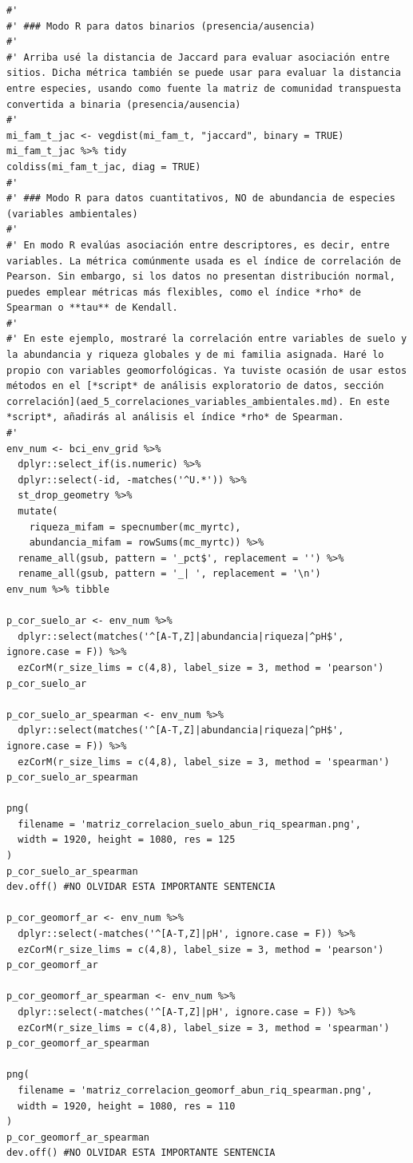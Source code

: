\documentclass[11pt,]{article}
\begin{document}
\begin{verbatim}
#' 
#' ### Modo R para datos binarios (presencia/ausencia)
#' 
#' Arriba usé la distancia de Jaccard para evaluar asociación entre sitios. Dicha métrica también se puede usar para evaluar la distancia entre especies, usando como fuente la matriz de comunidad transpuesta convertida a binaria (presencia/ausencia)
#' 
mi_fam_t_jac <- vegdist(mi_fam_t, "jaccard", binary = TRUE)
mi_fam_t_jac %>% tidy
coldiss(mi_fam_t_jac, diag = TRUE)
#'
#' ### Modo R para datos cuantitativos, NO de abundancia de especies (variables ambientales)
#' 
#' En modo R evalúas asociación entre descriptores, es decir, entre variables. La métrica comúnmente usada es el índice de correlación de Pearson. Sin embargo, si los datos no presentan distribución normal, puedes emplear métricas más flexibles, como el índice *rho* de Spearman o **tau** de Kendall.
#' 
#' En este ejemplo, mostraré la correlación entre variables de suelo y la abundancia y riqueza globales y de mi familia asignada. Haré lo propio con variables geomorfológicas. Ya tuviste ocasión de usar estos métodos en el [*script* de análisis exploratorio de datos, sección correlación](aed_5_correlaciones_variables_ambientales.md). En este *script*, añadirás al análisis el índice *rho* de Spearman.
#' 
env_num <- bci_env_grid %>%
  dplyr::select_if(is.numeric) %>%
  dplyr::select(-id, -matches('^U.*')) %>% 
  st_drop_geometry %>% 
  mutate(
    riqueza_mifam = specnumber(mc_myrtc),
    abundancia_mifam = rowSums(mc_myrtc)) %>% 
  rename_all(gsub, pattern = '_pct$', replacement = '') %>% 
  rename_all(gsub, pattern = '_| ', replacement = '\n')
env_num %>% tibble

p_cor_suelo_ar <- env_num %>%
  dplyr::select(matches('^[A-T,Z]|abundancia|riqueza|^pH$', ignore.case = F)) %>%
  ezCorM(r_size_lims = c(4,8), label_size = 3, method = 'pearson')
p_cor_suelo_ar

p_cor_suelo_ar_spearman <- env_num %>%
  dplyr::select(matches('^[A-T,Z]|abundancia|riqueza|^pH$', ignore.case = F)) %>%
  ezCorM(r_size_lims = c(4,8), label_size = 3, method = 'spearman')
p_cor_suelo_ar_spearman

png(
  filename = 'matriz_correlacion_suelo_abun_riq_spearman.png',
  width = 1920, height = 1080, res = 125
)
p_cor_suelo_ar_spearman
dev.off() #NO OLVIDAR ESTA IMPORTANTE SENTENCIA

p_cor_geomorf_ar <- env_num %>%
  dplyr::select(-matches('^[A-T,Z]|pH', ignore.case = F)) %>%
  ezCorM(r_size_lims = c(4,8), label_size = 3, method = 'pearson')
p_cor_geomorf_ar

p_cor_geomorf_ar_spearman <- env_num %>%
  dplyr::select(-matches('^[A-T,Z]|pH', ignore.case = F)) %>%
  ezCorM(r_size_lims = c(4,8), label_size = 3, method = 'spearman')
p_cor_geomorf_ar_spearman

png(
  filename = 'matriz_correlacion_geomorf_abun_riq_spearman.png',
  width = 1920, height = 1080, res = 110
)
p_cor_geomorf_ar_spearman
dev.off() #NO OLVIDAR ESTA IMPORTANTE SENTENCIA
\end{verbatim}
\end{document}
